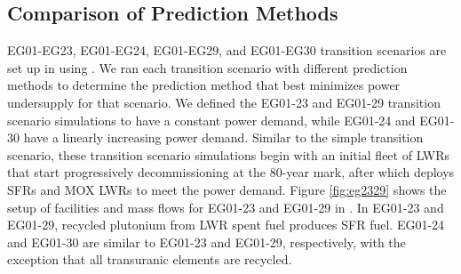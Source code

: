\subsection{Comparison of Prediction Methods}

EG01-EG23, EG01-EG24, EG01-EG29, and EG01-EG30 transition scenarios
are set up in \Cyclus using \deploy. 
We ran each transition scenario with different prediction 
methods to determine the prediction method that best minimizes 
power undersupply for that scenario. 
We defined the EG01-23 and EG01-29 transition scenario simulations to have a constant 
power demand, while EG01-24 and EG01-30 have a linearly increasing power demand. 
Similar to the simple transition scenario, these transition scenario 
simulations begin with an initial fleet of \glspl{LWR} 
that start progressively decommissioning at the 80-year mark, 
after which \deploy deploys \glspl{SFR} and \gls{MOX} \glspl{LWR} to meet 
the power demand. 
Figure \ref{fig:eg2329}
shows the setup of facilities and mass flows for 
EG01-23 and EG01-29 in \Cyclus. 
In EG01-23 and EG01-29, recycled plutonium from LWR spent fuel 
produces  \gls{SFR} fuel. 
EG01-24 and EG01-30 are similar to EG01-23 and EG01-29, respectively, 
with the exception that all transuranic elements are recycled.

